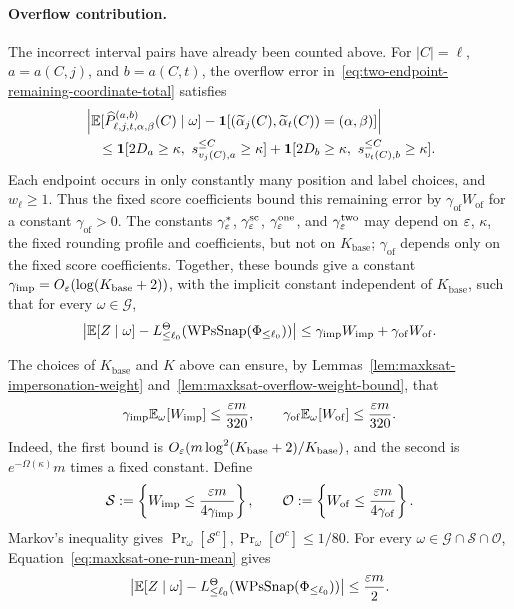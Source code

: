\paragraph{Overflow contribution.}
The incorrect interval pairs have already been counted above.
For $|C|=\ell$, $a=a(C,j)$, and $b=a(C,t)$, the overflow error in~\eqref{eq:two-endpoint-remaining-coordinate-total} satisfies
\[
\begin{aligned}
&\left|\mathbb E[\widehat P^{(a,b)}_{\ell,j,t,\alpha,\beta}(C)\mid\omega]
-\mathbf 1[(\widetilde\alpha_j(C),\widetilde\alpha_t(C))=(\alpha,\beta)]\right|\\
&\quad\le\mathbf 1[2D_a\ge\kappa,\ s_{v_j(C),a}^{\le C}\ge\kappa]
+\mathbf 1[2D_b\ge\kappa,\ s_{v_t(C),b}^{\le C}\ge\kappa].
\end{aligned}
\]
Each endpoint occurs in only constantly many position and label choices, and $w_\ell\ge1$.
Thus the fixed score coefficients bound this remaining error by $\gamma_{\mathrm{of}}W_{\mathrm{of}}$ for a constant $\gamma_{\mathrm{of}}>0$.
The constants $\gamma^\ast_\varepsilon$, $\gamma^{\mathrm{sc}}_\varepsilon$, $\gamma^{\mathrm{one}}_\varepsilon$, and $\gamma^{\mathrm{two}}_\varepsilon$ may depend on $\varepsilon$, $\kappa$, the fixed rounding profile and coefficients, but not on $K_{\mathrm{base}}$; $\gamma_{\mathrm{of}}$ depends only on the fixed score coefficients.
Together, these bounds give a constant $\gamma_{\mathrm{imp}}=O_\varepsilon(\log(K_{\mathrm{base}}+2))$, with the implicit constant independent of $K_{\mathrm{base}}$, such that for every $\omega\in\mathcal G$,
\begin{equation}\label{eq:maxksat-one-run-mean}
\left|\mathbb E[Z\mid\omega]
-L_{\le\ell_0}^\Theta(\operatorname{WPsSnap}(\Phi_{\le\ell_0}))\right|
\le\gamma_{\mathrm{imp}}W_{\mathrm{imp}}+\gamma_{\mathrm{of}}W_{\mathrm{of}}.
\end{equation}

The choices of $K_{\mathrm{base}}$ and $K$ above can ensure, by Lemmas~\ref{lem:maxksat-impersonation-weight} and~\ref{lem:maxksat-overflow-weight-bound}, that
\[
\gamma_{\mathrm{imp}}\mathbb E_\omega[W_{\mathrm{imp}}]\le\frac{\varepsilon m}{320},\qquad
\gamma_{\mathrm{of}}\mathbb E_\omega[W_{\mathrm{of}}]\le\frac{\varepsilon m}{320}.
\]
Indeed, the first bound is $O_\varepsilon(m\log^2(K_{\mathrm{base}}+2)/K_{\mathrm{base}})$, and the second is $e^{-\Omega(\kappa)}m$ times a fixed constant.
Define
\[
\mathcal S:=\left\{W_{\mathrm{imp}}\le\frac{\varepsilon m}{4\gamma_{\mathrm{imp}}}\right\},\qquad
\mathcal O:=\left\{W_{\mathrm{of}}\le\frac{\varepsilon m}{4\gamma_{\mathrm{of}}}\right\}.
\]
Markov's inequality gives $\Pr_\omega[\mathcal S^c],\Pr_\omega[\mathcal O^c]\le1/80$.
For every $\omega\in\mathcal G\cap\mathcal S\cap\mathcal O$, Equation~\eqref{eq:maxksat-one-run-mean} gives
\begin{equation}\label{eq:maxksat-one-run-mean-small}
\left|\mathbb E[Z\mid\omega]
-L_{\le\ell_0}^\Theta(\operatorname{WPsSnap}(\Phi_{\le\ell_0}))\right|
\le\frac{\varepsilon m}{2}.
\end{equation}

